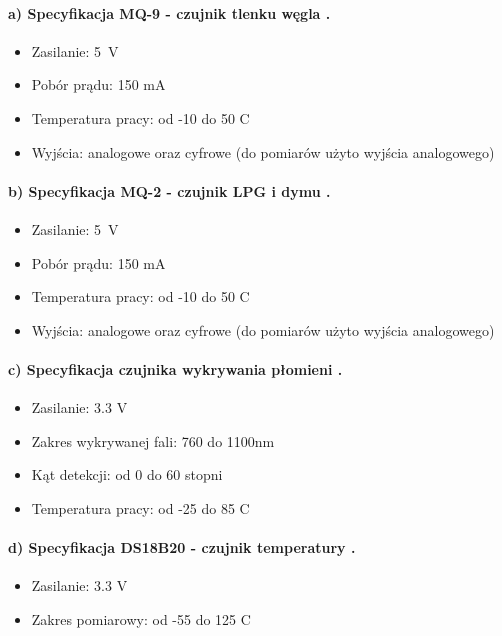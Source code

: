 \documentclass[polish,bachelor,a4paper,oneside]{ppfcmthesis}
\begin{document}
    \paragraph{a) Specyfikacja MQ-9 - czujnik tlenku węgla \cite{specyfikacjaMQ-9}.}
    \begin{itemize}
        \item Zasilanie: 5~V
        \item Pobór prądu: 150 mA
        \item Temperatura pracy: od -10 do 50 \textdegree{}C
        \item Wyjścia: analogowe oraz cyfrowe (do pomiarów użyto wyjścia analogowego)
    \end{itemize}
    \paragraph{b) Specyfikacja MQ-2 - czujnik LPG i dymu \protect\cite{specyfikacjaMQ-2}.}
    \begin{itemize}
        \item Zasilanie: 5~V
        \item Pobór prądu: 150 mA
        \item Temperatura pracy: od -10 do 50 \textdegree{}C
        \item Wyjścia: analogowe oraz cyfrowe (do pomiarów użyto wyjścia analogowego)
    \end{itemize}
    \paragraph{c) Specyfikacja czujnika wykrywania płomieni \protect\cite{specyfikacjaFlame}.}
    \begin{itemize}
        \item Zasilanie: 3.3 V
        \item Zakres wykrywanej fali: 760 do 1100nm
        \item Kąt detekcji: od 0 do 60 stopni
        \item Temperatura pracy: od -25 do 85 \textdegree{}C
    \end{itemize}
    \paragraph{d) Specyfikacja DS18B20 - czujnik temperatury \protect\cite{specyfikacjaTemp}.}
    \begin{itemize}
        \item Zasilanie: 3.3 V
        \item Zakres pomiarowy: od -55 do 125 \textdegree{}C
    \end{itemize}
\end{document}
